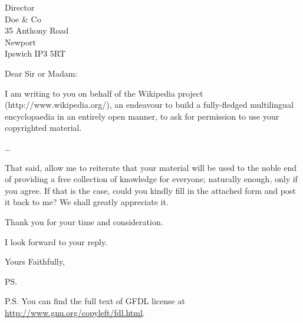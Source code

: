 \documentclass{letter}
\begin{document}
\begin{letter}{Director \\ Doe \& Co \\ 35 Anthony Road
\\ Newport \\ Ipswich IP3 5RT}
\opening{Dear Sir or Madam:}

I am writing to you on behalf of the Wikipedia project (http://www.wikipedia.org/),
an endeavour to build a fully-fledged multilingual encyclopaedia in an entirely
open manner, to ask for permission to use your copyrighted material.

\ldots

That said, allow me to reiterate that your material will be used to the noble end of
providing a free collection of knowledge for everyone; naturally enough, only if you
agree. If that is the case, could you kindly fill in the attached form and post it
back to me? We shall greatly appreciate it.

Thank you for your time and consideration.

I look forward to your reply.

\closing{Yours Faithfully,}

\ps

P.S. You can find the full text of GFDL license at
\url{http://www.gnu.org/copyleft/fdl.html}.


\end{letter}
\end{document}
